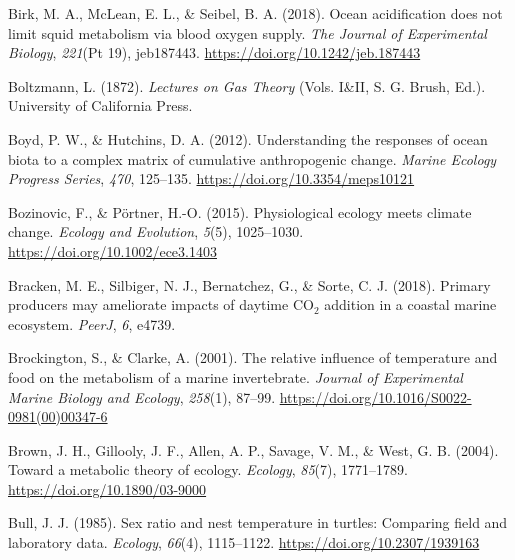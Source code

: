 \documentclass{CSUNthesis}
\begin{document}
\vspace{0.1em}

Birk, M. A., McLean, E. L., \& Seibel, B. A. (2018). Ocean acidification does not limit squid metabolism via blood oxygen supply. \textit{The Journal of Experimental Biology}, \textit{221}(Pt 19), jeb187443. \url{https://doi.org/10.1242/jeb.187443}

\vspace{0.1em}

Boltzmann, L. (1872). \textit{Lectures on Gas Theory} (Vols. I\&II, S. G. Brush, Ed.). University of California Press.

\vspace{0.1em}

Boyd, P. W., \& Hutchins, D. A. (2012). Understanding the responses of ocean biota to a complex matrix of cumulative anthropogenic change. \textit{Marine Ecology Progress Series}, \textit{470}, 125--135. \url{https://doi.org/10.3354/meps10121}

\vspace{0.1em}

Bozinovic, F., \& Pörtner, H.-O. (2015). Physiological ecology meets climate change. \textit{Ecology and Evolution}, \textit{5}(5), 1025--1030. \url{https://doi.org/10.1002/ece3.1403}

\vspace{0.1em}

Bracken, M. E., Silbiger, N. J., Bernatchez, G., \& Sorte, C. J. (2018). Primary producers may ameliorate impacts of daytime CO\(_2\) addition in a coastal marine ecosystem. \textit{PeerJ}, \textit{6}, e4739.

\vspace{0.1em}

Brockington, S., \& Clarke, A. (2001). The relative influence of temperature and food on the metabolism of a marine invertebrate. \textit{Journal of Experimental Marine Biology and Ecology}, \textit{258}(1), 87--99. \url{https://doi.org/10.1016/S0022-0981(00)00347-6}

\vspace{0.1em}

Brown, J. H., Gillooly, J. F., Allen, A. P., Savage, V. M., \& West, G. B. (2004). Toward a metabolic theory of ecology. \textit{Ecology}, \textit{85}(7), 1771--1789. \url{https://doi.org/10.1890/03-9000}

\vspace{0.1em}

Bull, J. J. (1985). Sex ratio and nest temperature in turtles: Comparing field and laboratory data. \textit{Ecology}, \textit{66}(4), 1115--1122. \url{https://doi.org/10.2307/1939163}
\end{document}
